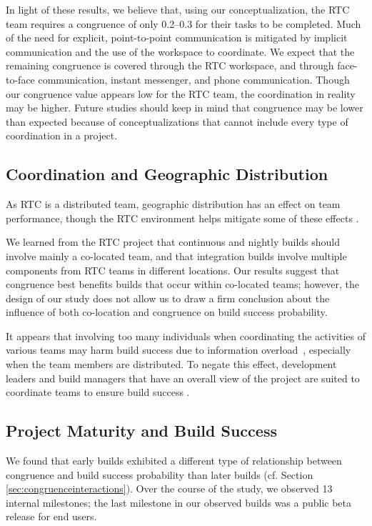 In light of these results, we believe that, using our conceptualization, the RTC team requires a congruence of only 0.2--0.3 for their tasks to be completed.
Much of the need for explicit, point-to-point communication is mitigated by implicit communication and the use of the workspace to coordinate.
We expect that the remaining congruence is covered through the RTC workspace, and through face-to-face communication, instant messenger, and phone communication. Though our congruence value appears low for the RTC team, the coordination in reality may be higher. Future studies should keep in mind that congruence may be lower than expected because of conceptualizations that cannot include every type of coordination in a project.

\subsection{Coordination and Geographic Distribution}
As RTC is a distributed team, geographic distribution has an effect on team performance, though the RTC environment helps mitigate some of these effects \cite{Nguyen:2008Distance}.

We learned from the RTC project that continuous and nightly builds should involve mainly a co-located team, and that integration builds involve multiple components from RTC teams in different locations. Our results suggest that congruence best benefits builds that occur within co-located teams; however, the design of our study does not allow us to draw a firm conclusion about the influence of both co-location and congruence on build success probability.

It appears that involving too many individuals when coordinating the activities of various teams may harm build success due to information overload~\cite{damian:icgse:2007}, especially when the team members are distributed. To negate this effect, development leaders and build managers that have an overall view of the project are suited to coordinate teams to ensure build success \cite{hinds:cscw:2006}.


\subsection{Project Maturity and Build Success}
We found that early builds exhibited a different type of relationship between congruence and build success probability than later builds (cf. Section \ref{sec:congruenceinteractions}). Over the course of the study, we observed 13 internal milestones; the last milestone in our observed builds was a public beta release for end users.

